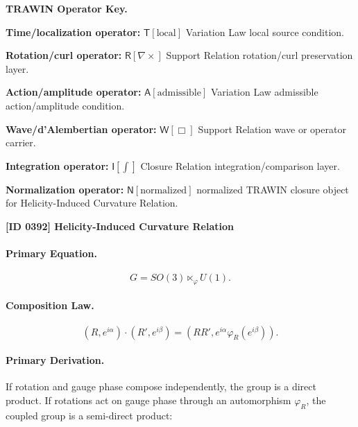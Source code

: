 \par\vspace{0.45\baselineskip}
\noindent\begin{minipage}[t]{\linewidth}
\begingroup
\small
\raggedright
\textbf{TRAWIN Operator Key.}\par
\noindent\textbf{Time/localization operator:} $\mathsf{T}\!\left[\mathrm{local}\right]$ Variation Law local source condition.\par
\noindent\textbf{Rotation/curl operator:} $\mathsf{R}\!\left[\nabla\times\right]$ Support Relation rotation/curl preservation layer.\par
\noindent\textbf{Action/amplitude operator:} $\mathsf{A}\!\left[\mathrm{admissible}\right]$ Variation Law admissible action/amplitude condition.\par
\noindent\textbf{Wave/d'Alembertian operator:} $\mathsf{W}\!\left[\Box\right]$ Support Relation wave or operator carrier.\par
\noindent\textbf{Integration operator:} $\mathsf{I}\!\left[\int\right]$ Closure Relation integration/comparison layer.\par
\noindent\textbf{Normalization operator:} $\mathsf{N}\!\left[\mathrm{normalized}\right]$ normalized TRAWIN closure object for Helicity-Induced Curvature Relation.\par
\endgroup
\end{minipage}

\clearpage
\noindent\textbf{[ID 0392] Helicity-Induced Curvature Relation}\par
\vspace{0.35em}
\paragraph{Primary Equation.}
\begin{equation}
G=SO(3)\ltimes_{\varphi} U(1).
\end{equation}

\paragraph{Composition Law.}
\begin{equation}
(R,e^{i\alpha})\cdot(R',e^{i\beta})
=
\left(
RR',
e^{i\alpha}\varphi_R(e^{i\beta})
\right).
\end{equation}

\paragraph{Primary Derivation.}
If rotation and gauge phase compose independently, the group is a direct product.  
If rotations act on gauge phase through an automorphism $\varphi_R$, the coupled group is a semi-direct product:

